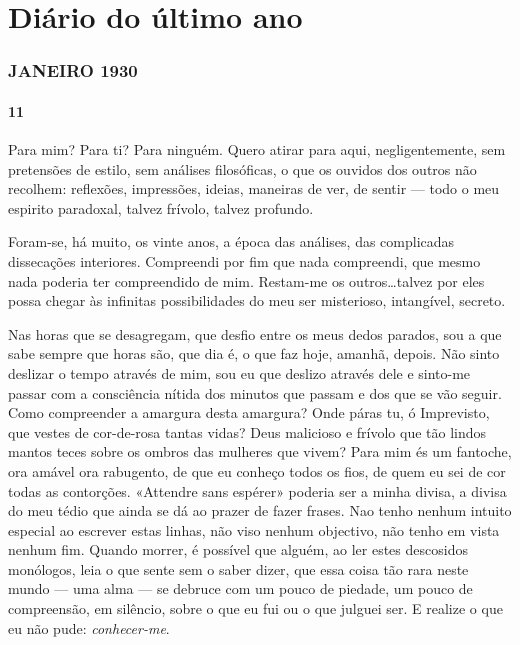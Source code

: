 \part{Diário do último ano}

\pagebreak

\section{JANEIRO 1930}

\subsection{11}

Para mim? Para ti? Para ninguém. Quero atirar
para aqui, negligentemente, sem pretensões de estilo,
sem análises filosóficas, o que os ouvidos dos outros
não recolhem: reflexões, impressões, ideias, maneiras
de ver, de sentir — todo o meu espirito paradoxal,
talvez frívolo, talvez profundo.

Foram-se, há muito, os vinte anos, a época das análises,
das complicadas dissecações interiores. Compreendi por
fim que nada compreendi, que mesmo nada poderia ter
compreendido de mim. Restam-me os outros\ldots talvez
por eles possa chegar às infinitas possibilidades do meu
ser misterioso, intangível, secreto.

Nas horas que se desagregam, que desfio entre os meus
dedos parados, sou a que sabe sempre que horas são,
que dia é, o que faz hoje, amanhã, depois. Não sinto
deslizar o tempo através de mim, sou eu que deslizo
através dele e sinto-me passar com a consciência
nítida dos minutos que passam e dos que se vão
seguir. Como compreender a amargura desta 
amargura? Onde páras tu, ó Imprevisto, que vestes de
cor-de-rosa tantas vidas? Deus malicioso e frívolo que
tão lindos mantos teces sobre os ombros das mulheres
que vivem? Para mim és um fantoche, ora amável
ora rabugento, de que eu conheço todos os fios, de
quem eu sei de cor todas as contorções. «Attendre sans
espérer» poderia ser a minha divisa, a divisa do meu
tédio que ainda se dá ao prazer de fazer frases.
Nao tenho nenhum intuito especial ao escrever estas
linhas, não viso nenhum objectivo, não tenho em vista
nenhum fim. Quando morrer, é possível que alguém,
ao ler estes descosidos monólogos, leia o que sente
sem o saber dizer, que essa coisa tão rara neste mundo
— uma alma — se debruce com um pouco de piedade,
um pouco de compreensão, em silêncio, sobre o que eu
fui ou o que julguei ser. E realize o que eu não pude:
\textit{conhecer-me}.

